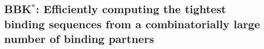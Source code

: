 \def\bbks{BBK$^*$\xspace}

\subsection{\bbks: Efficiently computing the tightest binding sequences from a combinatorially large number of binding partners}

~\cite{BBK*}